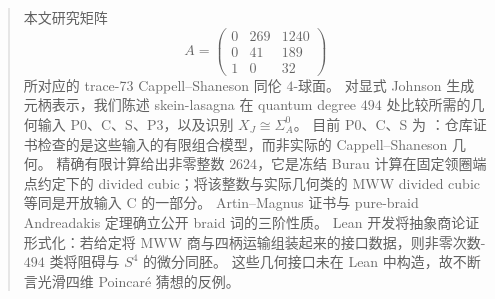 
\begin{abstract}
本文研究矩阵
\[
A=\begin{pmatrix}0&269&1240\\0&41&189\\1&0&32\end{pmatrix}
\]
所对应的 trace-73 Cappell--Shaneson 同伦 $4$-球面。
对显式 Johnson 生成元柄表示，我们陈述 skein-lasagna 在 quantum degree $494$ 处比较所需的几何输入 P0、C、S、P3，以及识别 $X_J\cong\Sigma_A^0$。
目前 P0、C、S 为 \Open：仓库证书检查的是这些输入的有限组合模型，而非实际的 Cappell--Shaneson 几何。
精确有限计算给出非零整数 $2624$，它是冻结 Burau 计算在固定领圈端点约定下的 divided cubic；将该整数与实际几何类的 MWW divided cubic 等同是开放输入 C 的一部分。
Artin--Magnus 证书与 pure-braid Andreadakis 定理确立公开 braid 词的三阶性质。
Lean 开发将抽象商论证形式化：若给定将 MWW 商与四柄运输组装起来的接口数据，则非零次数-$494$ 类将阻碍与 $S^4$ 的微分同胚。
这些几何接口未在 Lean 中构造，故不断言光滑四维 Poincaré 猜想的反例。
\end{abstract}

\maketitle
\tableofcontents
